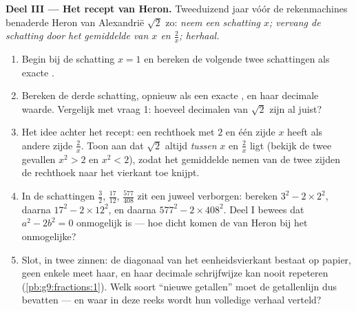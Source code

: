 \begin{problem}
\medskip
\noindent\textbf{Deel III --- Het recept van Heron.}
Tweeduizend jaar vóór de rekenmachines benaderde Heron van Alexandrië $\sqrt2$
zo: \emph{neem een schatting $x$; vervang de schatting door het gemiddelde van $x$
en $\frac2x$; herhaal.}
\begin{enumerate}[resume]
  \item Begin bij de schatting $x = 1$ en bereken de volgende twee schattingen als
        exacte .
  \item Bereken de derde schatting, opnieuw als een exacte , en haar decimale
        waarde. Vergelijk met vraag 1: hoeveel decimalen van $\sqrt2$ zijn al
        juist?
  \item Het idee achter het recept: een rechthoek met  $2$ en één zijde
        $x$ heeft als andere zijde $\frac2x$. Toon aan dat $\sqrt2$ altijd
        \emph{tussen} $x$ en $\frac2x$ ligt (bekijk de twee gevallen $x^2 > 2$ en
        $x^2 < 2$), zodat het gemiddelde nemen van de twee zijden de rechthoek naar
        het vierkant toe knijpt.
  \item In de schattingen $\frac32$, $\frac{17}{12}$, $\frac{577}{408}$ zit een
        juweel verborgen: bereken $3^2 - 2 \times 2^2$, daarna
        $17^2 - 2 \times 12^2$, en daarna $577^2 - 2 \times 408^2$. Deel I bewees
        dat $a^2 - 2b^2 = 0$ onmogelijk is --- hoe dicht komen de  van Heron
        bij het onmogelijke?
  \item Slot, in twee zinnen: de diagonaal van het eenheidsvierkant bestaat op
        papier, geen enkele  meet haar, en haar decimale schrijfwijze kan nooit
        repeteren (\cref{pb:g9:fractions:1}). Welk soort ``nieuwe getallen'' moet de
        getallenlijn dus bevatten --- en waar in deze reeks wordt hun volledige
        verhaal verteld?
\end{enumerate}
\end{problem}
